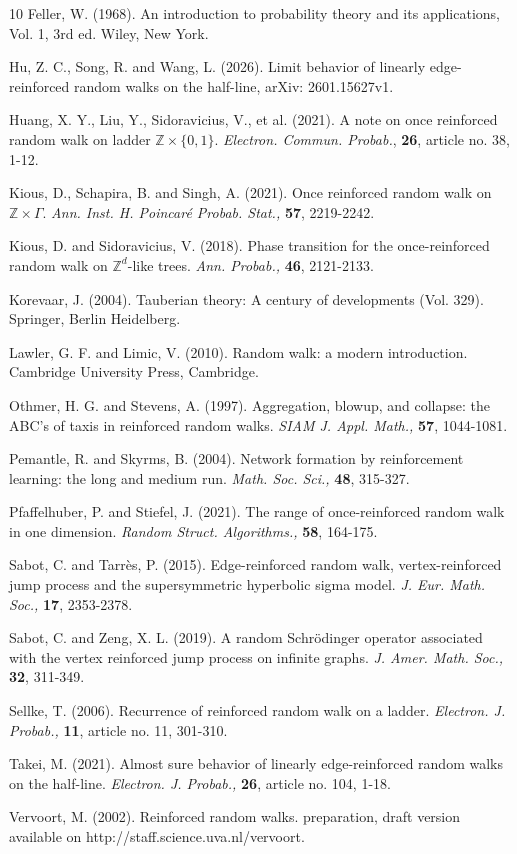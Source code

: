\documentclass[12pt]{article}
\numberwithin{equation}{section}
\begin{document}
\begin{thebibliography}{10}
 Feller, W. (1968). An introduction to probability theory and its applications, Vol. 1, 3rd ed. Wiley, New York.

 Hu, Z. C., Song, R. and Wang, L. (2026). Limit behavior of linearly edge-reinforced
random walks on the half-line, arXiv: 2601.15627v1.


 Huang, X. Y., Liu, Y., Sidoravicius, V., et al. (2021). A note on once reinforced random walk on ladder $\mathbb{Z}\times\{0,1\}$. {\it Electron. Commun. Probab.},
{\bf 26}, article no. 38, 1-12.

 Kious, D., Schapira, B. and Singh, A. (2021). Once reinforced random walk on $\mathbb{Z}\times \Gamma$. {\it Ann. Inst. H. Poincaré Probab. Stat.,} {\bf 57}, 2219-2242.


 Kious, D. and Sidoravicius, V. (2018). Phase transition for the once-reinforced random walk on $\mathbb{Z}^{d}$-like trees. {\it Ann. Probab.,} {\bf 46}, 2121-2133.
    
    


  Korevaar, J. (2004). Tauberian theory: A century of developments (Vol. 329). Springer, Berlin Heidelberg.

 Lawler, G. F. and Limic, V. (2010). Random walk: a modern introduction. Cambridge University Press, Cambridge.

 Othmer, H. G. and Stevens, A. (1997). Aggregation, blowup, and collapse: the ABC's of taxis in reinforced random walks. {\it SIAM J. Appl. Math.,} {\bf 57}, 1044-1081.
    
 Pemantle, R. and Skyrms, B. (2004). Network formation by reinforcement learning: the long and medium run. {\it Math. Soc. Sci.,} {\bf 48}, 315-327.

 Pfaffelhuber, P. and Stiefel, J. (2021). The range of
once-reinforced
random walk in one dimension. {\it Random Struct. Algorithms.,} {\bf 58}, 164-175.



 Sabot, C. and Tarr\`{e}s, P. (2015). Edge-reinforced random walk, vertex-reinforced jump process and the supersymmetric hyperbolic sigma model. {\it J. Eur. Math. Soc.,} {\bf 17}, 2353-2378.

 Sabot, C. and Zeng, X. L. (2019). A random Schr\"{o}dinger
operator associated with the vertex reinforced jump process on infinite graphs. {\it J. Amer. Math. Soc.,} {\bf 32}, 311-349.

 Sellke, T. (2006). Recurrence of reinforced random walk on a ladder. {\it Electron. J. Probab.,} {\bf 11}, article no. 11, 301-310.

 Takei, M. (2021). Almost sure behavior of linearly edge-reinforced random walks on the half-line. {\it Electron. J. Probab.,} {\bf 26}, article no. 104, 1-18.

 Vervoort, M. (2002). Reinforced random walks. preparation, draft version available on http://staff.science.uva.nl/vervoort.

\end{thebibliography}
\end{document}
